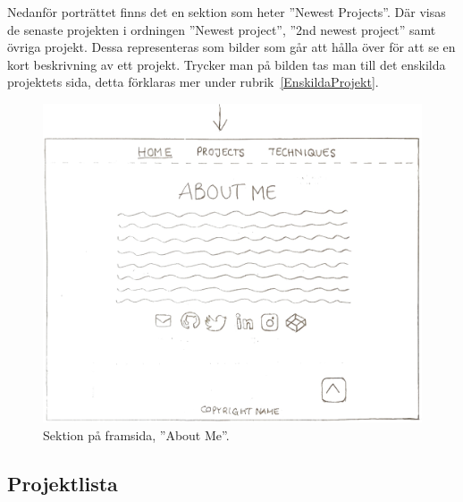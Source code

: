 \documentclass{TDP003mall}
\begin{document}
Nedanför porträttet finns det en sektion som heter ''Newest Projects''. Där visas de senaste projekten i ordningen ''Newest project'', ''2nd newest project'' samt övriga projekt. Dessa representeras som bilder som går att hålla över för att se en kort beskrivning av ett projekt. Trycker man på bilden tas man till det enskilda projektets sida, detta förklaras mer under rubrik~\ref{EnskildaProjekt}.

\begin{figure}[h]
  \centering
  \includegraphics[width=140mm]{2_aboutme.jpg}
  \caption{Sektion på framsida, ''About Me''.} \label{fig2:AboutMe}
\end{figure}




\pagebreak
\subsection{Projektlista}
\end{document}
